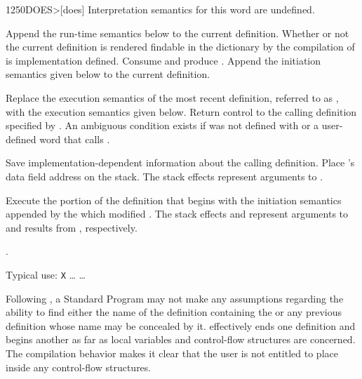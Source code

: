 \begin{worddef}[DOES]{1250}{DOES>}[does]
\interpret
	Interpretation semantics for this word are undefined.

\compile

	Append the run-time semantics below to the current definition.
	Whether or not the current definition is rendered findable in
	the dictionary by the compilation of  is
	implementation defined. Consume  and
	produce . Append the initiation semantics
	given below to the current definition.

\runtime
	\stack{}{}

	Replace the execution semantics of the most recent definition,
	referred to as , with the  execution
	semantics given below. Return control to the calling definition
	specified by . An ambiguous condition exists
	if  was not defined with  or a
	user-defined word that calls .

\init

	Save implementation-dependent information 
	about the calling definition. Place 's data field
	address on the stack. The stack effects  represent
	arguments to .

\execute[name]

	Execute the portion of the definition that begins with the
	initiation semantics appended by the  which modified
	. The stack effects  and 
	represent arguments to and results from ,
	respectively.

\see {}.

	\begin{defer}
	\rationale %
		Typical use:
			\word{:} \texttt{X} {\ldots}  {\ldots} \word{;}

		Following , a Standard Program may not make any
		assumptions regarding the ability to find either the name of
		the definition containing the  or any previous
		definition whose name may be concealed by it. 
		effectively ends one definition and begins another as far as
		local variables and control-flow structures are concerned.
		The compilation behavior makes it clear that the user is not
		entitled to place  inside any control-flow
		structures.


\end{defer}
\end{worddef}
